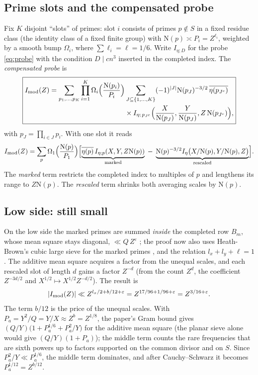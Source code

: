 \documentclass[11pt]{article}
\newcommand{\N}{\mathrm N}
\begin{document}
\subsection{Prime slots and the compensated probe}
Fix $K$ disjoint ``slots'' of primes: slot $i$ consists of primes $p\notin S$
in a fixed residue class (the identity class of a fixed finite group)
with $\N(p)\asymp P_i=Z^{\ell_i}$, weighted by a smooth bump $\Omega_i$, where
$\sum\ell_i=\ell=1/6$. Write $I_{\eta;D}$ for the probe \eqref{eq:probe} with the
condition $D\mid cn^3$ inserted in the completed index. The \emph{compensated
probe} is \cite[eq.\ compensated-probe-definition, L6894]{OAI78}
\begin{equation}\label{eq:compensated}
\boxed{\begin{aligned}
 I_{\rm mod}(Z)=\sum_{p_1,\dots,p_K}\prod_{i=1}^K\Omega_i\Bigl(\frac{\N(p_i)}{P_i}\Bigr)
 &\sum_{J\subseteq\{1,\dots,K\}}(-1)^{|J|}\N(p_J)^{-3/2}\,
 \overline{\eta(p_{J^c})}\\
 &\times I_{\eta;\,p_{J^c}}\Bigl(\frac X{\N(p_J)},\frac Y{\N(p_J)},Z\,\N(p_{J^c})\Bigr),
\end{aligned}}
\end{equation}
with $p_J=\prod_{i\in J}p_i$. With one slot it reads
\[
 I_{\rm mod}(Z)=\sum_p\Omega_1\Bigl(\frac{\N(p)}{P_1}\Bigr)\Bigl[
 \underbrace{\overline{\eta(p)}\,I_{\eta;p}(X,Y,Z\N(p))}_{\text{marked}}
 \;-\;\underbrace{\N(p)^{-3/2}I_\eta\bigl(X/\N(p),Y/\N(p),Z\bigr)}_{\text{rescaled}}\Bigr].
\]
The \emph{marked} term restricts the completed index to multiples of $p$
and lengthens its range to $Z\N(p)$. The \emph{rescaled} term shrinks both
averaging scales by $\N(p)$.

\subsection{Low side: still small}
On the low side the marked primes are summed \emph{inside} the completed
row $B_m$, whose mean square stays diagonal, $\ll Q\,Z^\varepsilon$
\cite[Lemma lem:probe-row-norm]{OAI78}; the proof now also uses Heath-Brown's cubic large
sieve \cite{HB} for the marked primes \cite[Lemma lem:hybrid-energy]{OAI78}, and the relation
$l_x+l_y+\ell=1$. The additive mean square acquires a factor from the unequal scales, and each
rescaled slot of length $d$ gains a factor $Z^{-d}$ (from the count $Z^{d}$, the coefficient
$Z^{-3d/2}$ and $X^{1/2}\mapsto X^{1/2}Z^{-d/2}$). The result
\cite[Prop.\ prop:probe-low]{OAI78} is
\[
 |I_{\rm mod}(Z)|\ll Z^{l_x/2+b/12+\varepsilon}=Z^{17/96+1/96+\varepsilon}=Z^{3/16+\varepsilon}.
\]
The term $b/12$ is the price of the unequal scales. With $P_a=Y^2/Q=Y/X\approx Z^{b}=Z^{1/8}$,
the paper's Gram bound gives $(Q/Y)\bigl(1+P_a^{1/6}+P_a^2/Y\bigr)$ for the additive mean square
\cite[Prop.\ prop:probe-gram]{OAI78} (the planar sieve alone would give $(Q/Y)(1+P_a)$); the
middle term counts the rare frequencies that are sixth powers up to factors supported on the
common divisor and on $S$. Since $P_a^2/Y\ll P_a^{1/6}$, the middle term dominates, and after
Cauchy--Schwarz it becomes $P_a^{1/12}=Z^{b/12}$.
\end{document}
